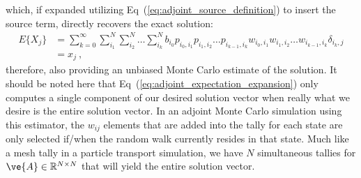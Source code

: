 \documentclass[letterpaper,11pt]{article}
\begin{document}
which, if expanded utilizing Eq~(\ref{eq:adjoint_source_definition})
to insert the source term, directly recovers the exact solution:
\begin{equation}
  \begin{split}
    E\{X_j\} &=\sum_{k=0}^{\infty}\sum_{i_1}^{N}\sum_{i_2}^{N}\ldots
    \sum_{i_k}^{N} b_{i_0} p_{i_0,i_1}p_{i_1,i_2}\ldots
    p_{i_{k-1},i_k} w_{i_0,i_1}w_{i_1,i_2}\ldots
    w_{i_{k-1},i_k} \delta_{i_k,j} \\ &= x_{j}\:,
  \end{split}
  \label{eq:adjoint_expectation_expansion}
\end{equation}
therefore, also providing an unbiased Monte Carlo estimate of the
solution. It should be noted here that
Eq~(\ref{eq:adjoint_expectation_expansion}) only computes a single
component of our desired solution vector when really what we desire is
the entire solution vector. In an adjoint Monte Carlo simulation using
this estimator, the $w_{ij}$ elements that are added into the tally
for each state are only selected if/when the random walk currently
resides in that state. Much like a mesh tally in a particle transport
simulation, we have $N$ simultaneous tallies for $\ve{A} \in
\mathbb{R}^{N \times N}$ that will yield the entire solution vector.
\end{document}
